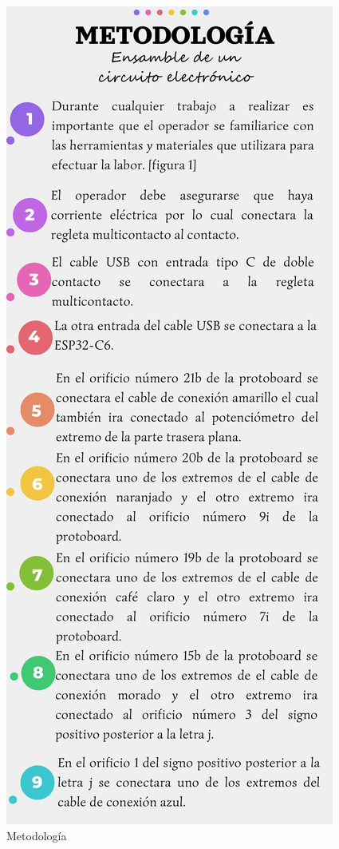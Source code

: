     \begin{figure}[H]
        \centering
        \includegraphics[trim = {5mm 10mm 5mm 50mm},clip,scale=0.4]{16/Img/Instructivo C.E (1).pdf}
        \caption{Metodología}
        \label{fig:metodología}
    \end{figure}
